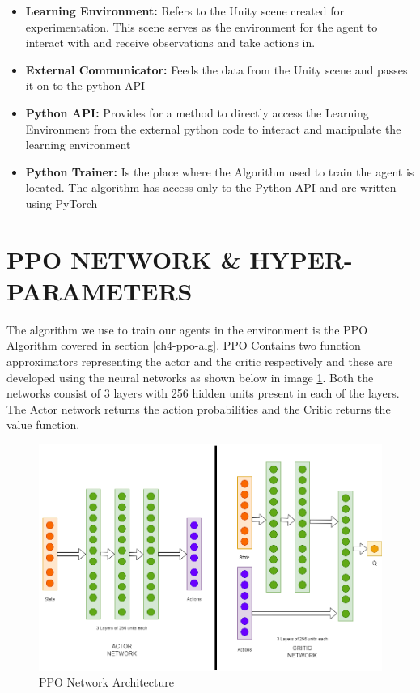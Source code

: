 \begin{itemize}
    \item \textbf{Learning Environment:} Refers to the Unity scene created for experimentation. This scene serves as the environment for the agent to interact with and receive observations and take actions in.
    \item \textbf{External Communicator: } Feeds the data from the Unity scene and passes it on to the python API
    \item \textbf{Python API: } Provides for a method to directly access the Learning Environment from the external python code to interact and manipulate the learning environment
    \item \textbf{Python Trainer: } Is the place where the Algorithm used to train the agent is located. The algorithm has access only to the Python API and are written using PyTorch \cite{Pytorch}
\end{itemize}

\section{PPO NETWORK \& HYPER-PARAMETERS}

The algorithm we use to train our agents in the environment is the PPO Algorithm covered in section \ref{ch4-ppo-alg}. PPO Contains two function approximators representing the actor and the critic respectively and these are developed using the neural networks as shown below in image \ref{fig:ppo-network}. Both the networks consist of 3 layers with 256 hidden units present in each of the layers. The Actor network returns the action probabilities and the Critic returns the value function.


\begin{figure}[H]
    \centering
    \includegraphics[width=1.0\textwidth]{images/ppo-network-v2.png}
    \caption{PPO Network Architecture}
    \label{fig:ppo-network}
\end{figure}

